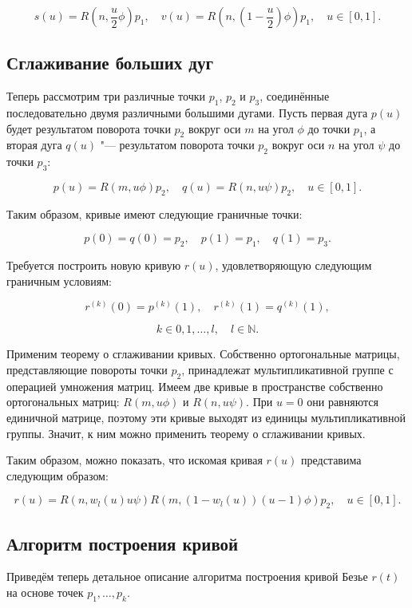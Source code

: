 \begin{equation}
s(u)=R(n,\frac{u}{2}\phi)p_1, \quad v(u)=R(n,(1-\frac{u}{2})\phi)p_1, \quad u \in [0,1].
\label{two-dimension-big-arc-halfs}
\end{equation}

\subsection*{Сглаживание больших дуг}

Теперь рассмотрим три различные точки $p_1$, $p_2$ и $p_3$, соединённые последовательно двумя различными большими
дугами. Пусть первая дуга $p(u)$ будет результатом поворота точки $p_2$ вокруг оси $m$ на угол $\phi$ до точки $p_1$,
а вторая дуга $q(u)$ "--- результатом поворота точки $p_2$ вокруг оси $n$ на угол $\psi$ до точки $p_3$:

$$
p(u)=R(m,u\phi)p_2, \quad q(u)=R(n,u\psi)p_2, \quad u \in [0,1].
$$

Таким образом, кривые имеют следующие граничные точки:

$$
p(0)=q(0)=p_2, \quad p(1)=p_1, \quad q(1)=p_3.
$$

Требуется построить новую кривую $r(u)$, удовлетворяющую следующим граничным условиям:

$$
r^{(k)}(0)=p^{(k)}(1), \quad r^{(k)}(1)=q^{(k)}(1),
$$

$$
k \in {0,1,\dots,l}, \quad l \in \mathbb{N}.
$$

Применим теорему о сглаживании кривых. Собственно ортогональные матрицы, представляющие повороты
точки $p_2$, принадлежат мультипликативной группе с операцией умножения матриц. Имеем две кривые в пространстве
собственно ортогональных матриц: $R(m,u\phi)$ и $R(n,u\psi)$. При $u=0$ они равняются единичной матрице, поэтому эти
кривые выходят из единицы мультипликативной группы. Значит, к ним можно применить теорему о сглаживании кривых.

Таким образом, можно показать, что искомая кривая $r(u)$ представима следующим образом:

$$
r(u)=R(n,w_l(u)u\psi)R(m,(1-w_l(u))(u-1)\phi)p_2, \quad u \in [0,1].
$$

\subsection*{Алгоритм построения кривой}

Приведём теперь детальное описание алгоритма построения кривой Безье $r(t)$ на основе точек $p_1,\dots,p_k$.

